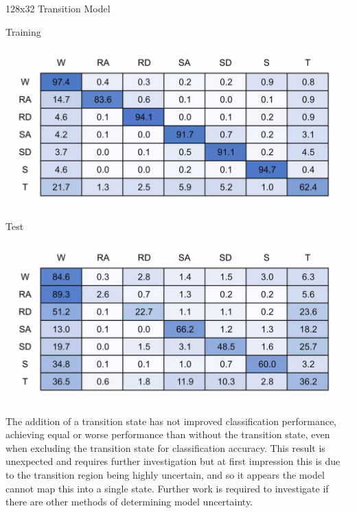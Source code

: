 \documentclass[sensors,article,submit,moreauthors,pdftex]{Definitions/mdpi}
\begin{document}
\begin{table}[!hbt]
    \centering
    \caption{128x32 Transition Model}
    \label{tab:128x32_transition_confusion_matrix}
    \begin{subtable}{.45\textwidth}
        \centering
        \caption{Training}
        \label{tab:tran_model_conf_matrix_training_128x32}
        \includegraphics[width=\textwidth]{Figures/results/conf_matricies/Training_128x32_T.jpg}
    \end{subtable}
    \hfil
    \begin{subtable}{.45\textwidth}
        \centering
        \caption{Test}
        \label{tab:tran_model_conf_matrix_test_128x32}
        \includegraphics[width=\textwidth]{Figures/results/conf_matricies/Test_128x32_T.jpg}
    \end{subtable}
\end{table}

The addition of a transition state has not improved classification performance, achieving equal or worse performance than without the transition state, even when excluding the transition state for classification accuracy. This result is unexpected and requires further investigation but at first impression this is due to the transition region being highly uncertain, and so it appears the model cannot map this into a single state. Further work is required to investigate if there are other methods of determining model uncertainty.
\end{document}
